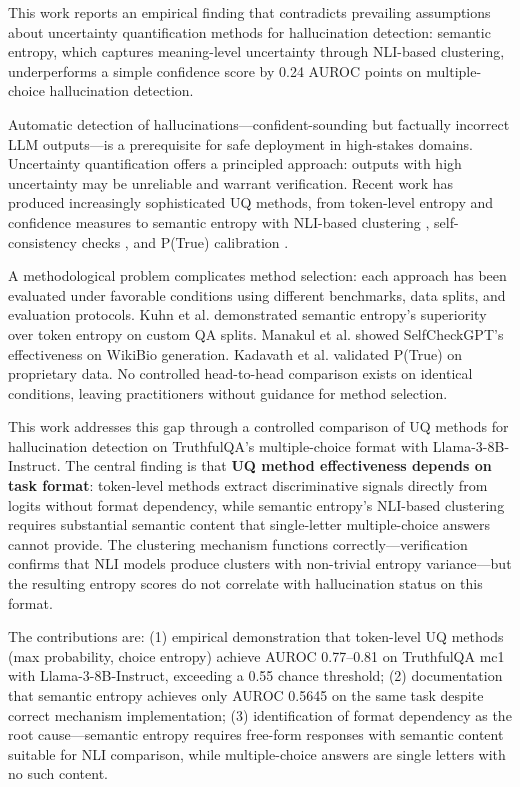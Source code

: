
This work reports an empirical finding that contradicts prevailing assumptions about uncertainty quantification methods for hallucination detection: semantic entropy, which captures meaning-level uncertainty through NLI-based clustering, underperforms a simple confidence score by 0.24 AUROC points on multiple-choice hallucination detection.

Automatic detection of hallucinations---confident-sounding but factually incorrect LLM outputs---is a prerequisite for safe deployment in high-stakes domains. Uncertainty quantification offers a principled approach: outputs with high uncertainty may be unreliable and warrant verification. Recent work has produced increasingly sophisticated UQ methods, from token-level entropy and confidence measures to semantic entropy with NLI-based clustering \citep{kuhn2023semantic}, self-consistency checks \citep{manakul2023selfcheckgpt}, and P(True) calibration \citep{kadavath2022language}.

A methodological problem complicates method selection: each approach has been evaluated under favorable conditions using different benchmarks, data splits, and evaluation protocols. Kuhn et al. demonstrated semantic entropy's superiority over token entropy on custom QA splits. Manakul et al. showed SelfCheckGPT's effectiveness on WikiBio generation. Kadavath et al. validated P(True) on proprietary data. No controlled head-to-head comparison exists on identical conditions, leaving practitioners without guidance for method selection.

This work addresses this gap through a controlled comparison of UQ methods for hallucination detection on TruthfulQA's multiple-choice format with Llama-3-8B-Instruct. The central finding is that \textbf{UQ method effectiveness depends on task format}: token-level methods extract discriminative signals directly from logits without format dependency, while semantic entropy's NLI-based clustering requires substantial semantic content that single-letter multiple-choice answers cannot provide. The clustering mechanism functions correctly---verification confirms that NLI models produce clusters with non-trivial entropy variance---but the resulting entropy scores do not correlate with hallucination status on this format.

The contributions are: (1) empirical demonstration that token-level UQ methods (max probability, choice entropy) achieve AUROC 0.77--0.81 on TruthfulQA mc1 with Llama-3-8B-Instruct, exceeding a 0.55 chance threshold; (2) documentation that semantic entropy achieves only AUROC 0.5645 on the same task despite correct mechanism implementation; (3) identification of format dependency as the root cause---semantic entropy requires free-form responses with semantic content suitable for NLI comparison, while multiple-choice answers are single letters with no such content.

